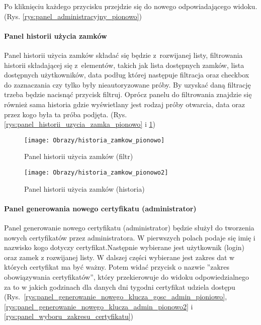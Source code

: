 Po kliknięciu każdego przycisku przejdzie się do nowego odpowiadającego widoku. (Rys. \ref{rys:panel_administracyjny_pionowo})

\newpage

\paragraph*{Panel historii użycia zamków}
Panel historii użycia zamków składać się będzie z~rozwijanej listy, filtrowania historii składającej się z~elementów, takich jak lista dostępnych zamków, lista dostępnych użytkowników, data podług której następuje filtracja oraz checkbox do zaznaczania czy tylko były nieautoryzowane próby. By uzyskać daną filtrację trzeba będzie nacisnąć przycisk filtruj. Oprócz panelu do filtrowania znajdzie się również sama historia gdzie wyświetlany jest rodzaj próby otwarcia, data oraz przez kogo była ta próba podjęta. (Rys. \ref{rys:panel_historii_uzycia_zamka_pionowo} i \ref{rys:panel_historii_uzycia_zamka_pionowo2})

\begin{figure}[ht!]
	\begin{minipage}{0.45\textwidth}
		\texttt{[image: Obrazy/historia\_zamkow\_pionowo]}
		\caption{Panel historii użycia zamków (filtr)}
		\label{rys:panel_historii_uzycia_zamka_pionowo}
	\end{minipage}
	\hspace{0.1\textwidth}
	\begin{minipage}{0.45\textwidth}
		\texttt{[image: Obrazy/historia\_zamkow\_pionowo2]}
		\caption{Panel historii użycia zamków (historia)}
		\label{rys:panel_historii_uzycia_zamka_pionowo2}	
	\end{minipage}
\end{figure}
\newpage

\paragraph*{Panel generowania nowego certyfikatu (administrator)}
Panel generowanie nowego certyfikatu (administrator) będzie służył do tworzenia nowych certyfikatów przez administratora. W pierwszych polach podaje się imię i nazwisko kogo dotyczy certyfikat.Następnie wybierane jest użytkownik (login) oraz zamek z rozwijanej listy. W dalszej części wybierane jest zakres dat w których certyfikat ma być ważny. Potem widać przycisk o nazwie ''zakres obowiązywania certyfikatów'', który przekierowuje do widoku odpowiedzialnego za to w jakich godzinach dla danych dni tygodni certyfikat udziela dostępu (Rys.~\ref{rys:panel_generowanie_nowego_klucza_gosc_admin_pioniowo}, \ref{rys:panel_generowanie_nowego_klucza_admin_pionowo2} i 
\ref{rys:panel_wyboru_zakresu_certyfikatu})

